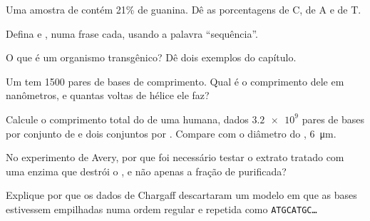 \begin{exercise}[$\star$]\label{exo:g10:universal-dna:3}
Uma amostra de  contém 21\% de guanina. Dê as porcentagens de C, de
A e de T.
\end{exercise}

\begin{exercise}[$\star$]\label{exo:g10:universal-dna:4}
Defina  e , numa frase cada, usando a palavra ``sequência''.
\end{exercise}

\begin{exercise}[$\star$]\label{exo:g10:universal-dna:5}
O que é um organismo transgênico? Dê dois exemplos do capítulo.
\end{exercise}

\begin{exercise}[$\star\star$]\label{exo:g10:universal-dna:6}
Um  tem 1500 pares de bases de comprimento. Qual é o comprimento
dele em nanômetros, e quantas voltas de hélice ele faz?
\end{exercise}

\begin{exercise}[$\star\star$]\label{exo:g10:universal-dna:7}
Calcule o comprimento total do  de uma  humana, dados
$\num{3.2e9}$ pares de bases por conjunto de  e dois
conjuntos por . Compare com o diâmetro do ,
\qty{6}{\micro m}.
\end{exercise}

\begin{exercise}[$\star\star$]\label{exo:g10:universal-dna:8}
No experimento de Avery, por que foi necessário testar o extrato
tratado com uma enzima que destrói o , e não apenas a fração de 
purificada?
\end{exercise}

\begin{exercise}[$\star\star$]\label{exo:g10:universal-dna:9}
Explique por que os dados de Chargaff descartaram um modelo em que as
bases estivessem empilhadas numa ordem regular e repetida como
\texttt{ATGCATGC\dots}
\end{exercise}


